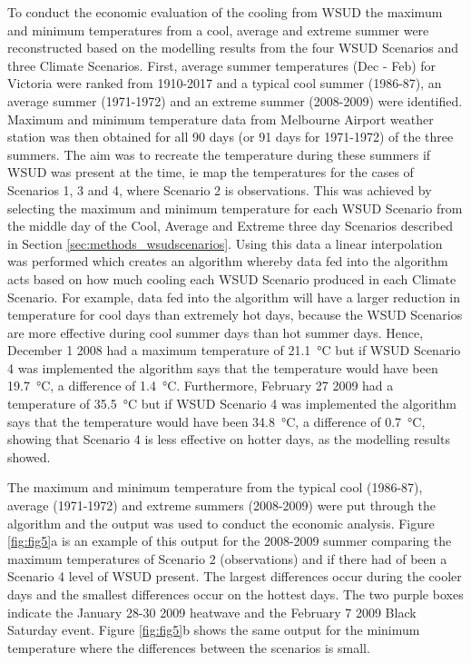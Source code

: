 \documentclass[final,3p,times,authoryear]{elsarticle}
\begin{document}
To conduct the economic evaluation of the cooling from WSUD the maximum and minimum temperatures from a cool, average and extreme summer were reconstructed based on the modelling results from the four WSUD Scenarios and three Climate Scenarios. First, average summer temperatures (Dec - Feb) for Victoria were ranked from 1910-2017 and a typical cool summer (1986-87), an average summer (1971-1972) and an extreme summer (2008-2009) were identified. Maximum and minimum temperature data from Melbourne Airport weather station was then obtained for all 90 days (or 91 days for 1971-1972) of the three summers. The aim was to recreate the temperature during these summers if WSUD was present at the time, ie map the temperatures for the cases of Scenarios 1, 3 and 4, where Scenario 2 is observations. This was achieved by selecting the maximum and minimum temperature for each WSUD Scenario from the middle day of the Cool, Average and Extreme three day Scenarios described in Section \ref{sec:methods_wsudscenarios}. Using this data a linear interpolation was performed which creates an algorithm whereby data fed into the algorithm acts based on how much cooling each WSUD Scenario produced in each Climate Scenario. For example, data fed into the algorithm will have a larger reduction in temperature for cool days than extremely hot days, because the WSUD Scenarios are more effective during cool summer days than hot summer days. Hence, December 1 2008 had a maximum temperature of 21.1\SI{}{\degreeCelsius} but if WSUD Scenario 4 was implemented the algorithm says that the temperature would have been 19.7\SI{}{\degreeCelsius}, a difference of 1.4\SI{}{\degreeCelsius}. Furthermore, February 27 2009 had a temperature of 35.5\SI{}{\degreeCelsius} but if WSUD Scenario 4 was implemented the algorithm says that the temperature would have been 34.8\SI{}{\degreeCelsius}, a difference of 0.7\SI{}{\degreeCelsius}, showing that Scenario 4 is less effective on hotter days, as the modelling results showed.

The maximum and minimum temperature from the typical cool (1986-87), average (1971-1972) and extreme summers (2008-2009) were put through the algorithm and the output was used to conduct the economic analysis. Figure \ref{fig:fig5}a is an example of this output for the 2008-2009 summer comparing the maximum temperatures of Scenario 2 (observations) and if there had of been a Scenario 4 level of WSUD present. The largest differences occur during the cooler days and the smallest differences occur on the hottest days. The two purple boxes indicate the January 28-30 2009 heatwave and the February 7 2009 Black Saturday event. Figure \ref{fig:fig5}b shows the same output for the minimum temperature where the differences between the scenarios is small.
\end{document}
